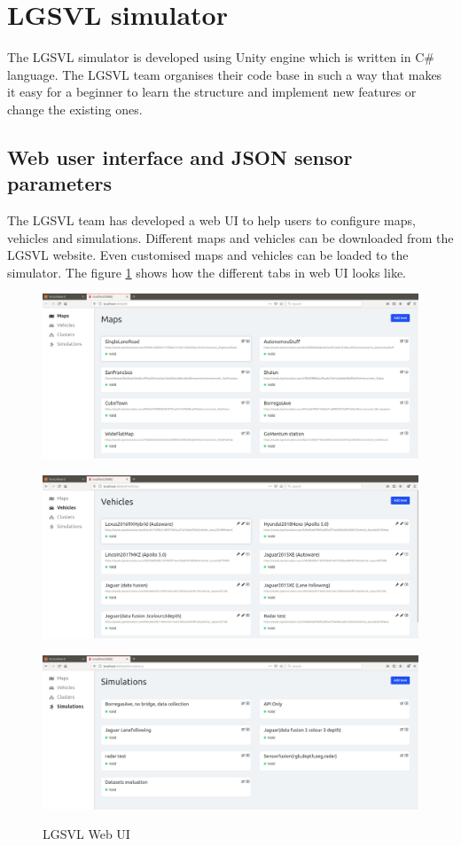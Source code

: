 \section{LGSVL simulator}
The LGSVL simulator is developed using Unity engine which is written in C\# language.
The LGSVL team organises their code base\cite{lgsvlgithub} in such a way that makes it
easy for a beginner to learn the structure and implement new features or change the
existing ones.
\subsection{Web user interface and JSON sensor parameters}
The LGSVL team has developed a web UI to help users to configure maps, vehicles and
simulations. Different maps and vehicles can be downloaded from the LGSVL website. Even
customised maps and vehicles can be loaded to the simulator.
\iffalse
The figure
\ref{fig:lgsvlwebui} shows how the different tabs in web UI looks like.
\begin{figure}\centering
{\includegraphics[scale=0.2]{figures/png/scrot_maps_tab.png}}
\par
{\includegraphics[scale=0.2]{figures/png/scrot_vehicles_tab.png}}
\par
{\includegraphics[scale=0.2]{figures/png/scrot_simulations_tab.png}
}
\caption{LGSVL Web UI}
\label{fig:lgsvlwebui}
\end{figure}
